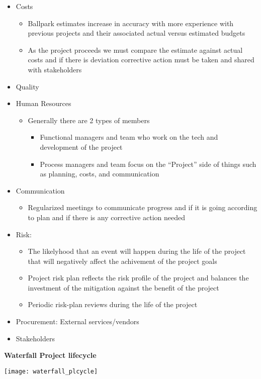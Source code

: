 \documentclass[12pt]{report}
\begin{document}
\begin{itemize}
\begin{itemize}
          \end{itemize}
    \item Costs
          \begin{itemize}
                  \item Ballpark estimates increase in accuracy with more experience with previous projects and their associated actual versus estimated budgets
                  \item As the project proceeds we must compare the estimate against actual costs and if there is deviation corrective action must be taken and shared with stakeholders
          \end{itemize}
    \item Quality
    \item Human Resources
          \begin{itemize}
            \item Generally there are 2 types of members
                  \begin{itemize}
                    \item Functional managers and team who work on the tech and development of the project
                          \item Process managers and team focus on the ``Project'' side of things such as planning, costs, and communication
                  \end{itemize}
          \end{itemize}
    \item Communication
          \begin{itemize}
                  \item Regularized meetings to communicate progress and if it is going according to plan and if there is any corrective action needed
          \end{itemize}
    \item Risk:
          \begin{itemize}
              \item The likelyhood that an event will happen during the life of the project that will negatively affect the achivement of the project goals
                  \item Project risk plan reflects the risk profile of the project and balances the investment of the mitigation against the benefit of the project
                  \item Periodic risk-plan reviews during the life of the project
          \end{itemize}
    \item Procurement: External services/vendors
    \item Stakeholders
  \end{itemize}

\textbf{Waterfall Project lifecycle}

\texttt{[image: waterfall\_plcycle]}
\end{document}

